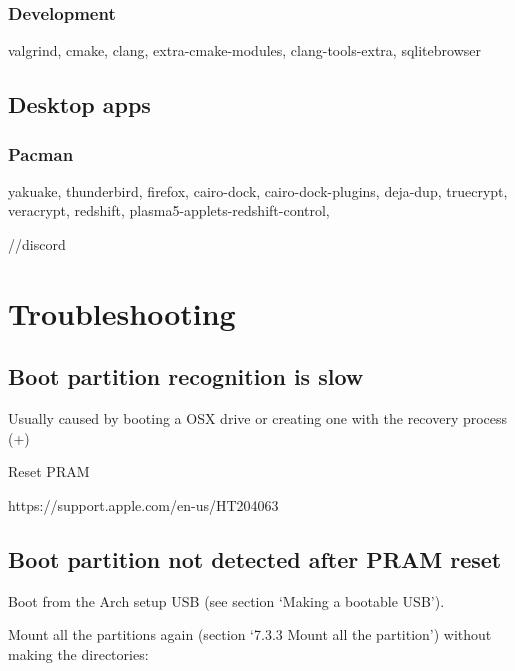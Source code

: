\subsubsection{Development}

valgrind, cmake, clang, extra-cmake-modules, clang-tools-extra, 
sqlitebrowser

\subsection{Desktop apps}


\subsubsection{Pacman}

yakuake, thunderbird, firefox, cairo-dock, cairo-dock-plugins, deja-dup, truecrypt, veracrypt, 
redshift, plasma5-applets-redshift-control, 



//discord

\section{Troubleshooting}

\subsection{Boot partition recognition is slow}

Usually caused by booting a OSX drive or creating one with the recovery process (+)

Reset PRAM

https://support.apple.com/en-us/HT204063

\subsection{Boot partition not detected after PRAM reset}

Boot from the Arch setup USB (see section `Making a bootable USB').

Mount all the partitions again (section `7.3.3 Mount all the partition') without making the directories:


